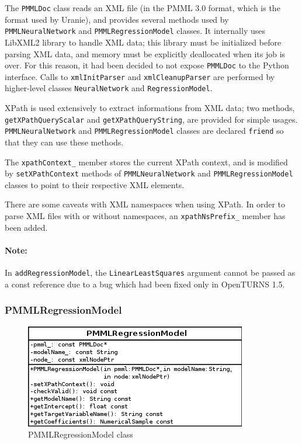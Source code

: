 The \texttt{PMMLDoc} class reads an XML file (in the PMML 3.0 format, which is
the format used by Uranie), and provides several methods used by
\texttt{PMMLNeuralNetwork} and \texttt{PMMLRegressionModel} classes.
It internally uses LibXML2 library to handle XML data; this library must be initialized
before parsing XML data, and memory must be explicitly deallocated when its job is over.
For this reason, it had been decided to not expose \texttt{PMMLDoc} to the Python interface.
Calls to \texttt{xmlInitParser} and \texttt{xmlCleanupParser} are performed by higher-level
classes \texttt{NeuralNetwork} and \texttt{RegressionModel}.

XPath is used extensively to extract informations from XML data; two methods,
\texttt{getXPathQueryScalar} and \texttt{getXPathQueryString}, are provided for
simple usages.  \texttt{PMMLNeuralNetwork} and \texttt{PMMLRegressionModel} classes
are declared \texttt{friend} so that they can use these methods.

The \verb+xpathContext_+ member stores the current XPath context, and is modified by
\texttt{setXPathContext} methods of \texttt{PMMLNeuralNetwork} and \texttt{PMMLRegressionModel} classes
to point to their respective XML elements.

There are some caveats with XML namespaces when using XPath.  In order to parse XML files with or
without namespaces, an \verb+xpathNsPrefix_+ member has been added.

\paragraph{Note:}
In \texttt{addRegressionModel}, the \texttt{LinearLeastSquares} argument cannot be passed as a
const reference due to a bug which had been fixed only in OpenTURNS 1.5.

\subsubsection{PMMLRegressionModel}

\begin{figure}[htb]
  \begin{center}
    \includegraphics[scale=0.7]{PMMLRegressionModel.png}
    \caption{PMMLRegressionModel class}\label{fig:archi:PMMLRegressionModel}
  \end{center}
\end{figure}

